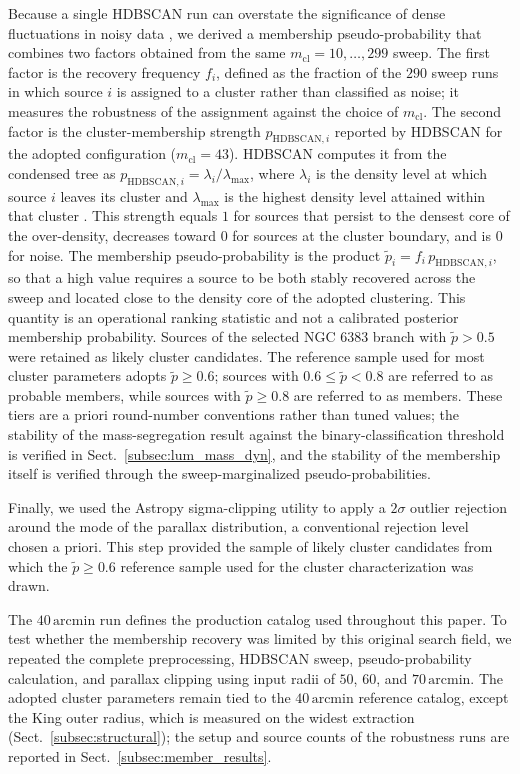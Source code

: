 \documentclass{aa}
\begin{document}
Because a single HDBSCAN run can overstate the significance of dense fluctuations in noisy data \citep{2021A&A...646A.104H}, we derived a membership pseudo-probability that combines two factors obtained from the same $m_{\mathrm{cl}}=10,\ldots,299$ sweep. The first factor is the recovery frequency $f_i$, defined as the fraction of the $290$ sweep runs in which source $i$ is assigned to a cluster rather than classified as noise; it measures the robustness of the assignment against the choice of $m_{\mathrm{cl}}$. The second factor is the cluster-membership strength $p_{\mathrm{HDBSCAN},i}$ reported by HDBSCAN for the adopted configuration ($m_{\mathrm{cl}}=43$). HDBSCAN computes it from the condensed tree as $p_{\mathrm{HDBSCAN},i}=\lambda_i/\lambda_{\mathrm{max}}$, where $\lambda_i$ is the density level at which source $i$ leaves its cluster and $\lambda_{\mathrm{max}}$ is the highest density level attained within that cluster \citep{McInnes2017}. This strength equals $1$ for sources that persist to the densest core of the over-density, decreases toward $0$ for sources at the cluster boundary, and is $0$ for noise. The membership pseudo-probability is the product $\tilde{p}_i=f_i\,p_{\mathrm{HDBSCAN},i}$, so that a high value requires a source to be both stably recovered across the sweep and located close to the density core of the adopted clustering. This quantity is an operational ranking statistic and not a calibrated posterior membership probability. Sources of the selected NGC 6383 branch with $\tilde{p}>0.5$ were retained as likely cluster candidates. The reference sample used for most cluster parameters adopts $\tilde{p}\geq0.6$; sources with $0.6\leq\tilde{p}<0.8$ are referred to as probable members, while sources with $\tilde{p}\geq0.8$ are referred to as members. These tiers are a priori round-number conventions rather than tuned values; the stability of the mass-segregation result against the binary-classification threshold is verified in Sect.~\ref{subsec:lum_mass_dyn}, and the stability of the membership itself is verified through the sweep-marginalized pseudo-probabilities.

Finally, we used the Astropy sigma-clipping \citep{astropy:2013,astropy:2018,astropy:2022} utility to apply a $2\sigma$ outlier rejection around the mode of the parallax distribution, a conventional rejection level chosen a priori. This step provided the sample of likely cluster candidates from which the $\tilde{p}\geq0.6$ reference sample used for the cluster characterization was drawn.

The $40\,\mathrm{arcmin}$ run defines the production catalog used throughout this paper. To test whether the membership recovery was limited by this original search field, we repeated the complete preprocessing, HDBSCAN sweep, pseudo-probability calculation, and parallax clipping using input radii of $50$, $60$, and $70\,\mathrm{arcmin}$. The adopted cluster parameters remain tied to the $40\,\mathrm{arcmin}$ reference catalog, except the King outer radius, which is measured on the widest extraction (Sect.~\ref{subsec:structural}); the setup and source counts of the robustness runs are reported in Sect.~\ref{subsec:member_results}.
\end{document}
